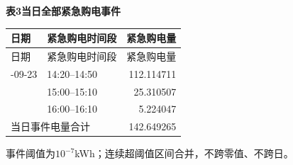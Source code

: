 \begin{center}\textbf{表3\quad 当日全部紧急购电事件}\end{center}
\begin{longtable}{llr}\toprule 日期 & 紧急购电时间段 & 紧急购电量\\\midrule\endfirsthead
\toprule 日期 & 紧急购电时间段 & 紧急购电量\\\midrule\endhead
\bottomrule\endfoot
2025-09-23 & 14:20--14:50 & 112.114711\\
 & 15:00--15:10 & 25.310507\\
 & 16:00--16:10 & 5.224047\\
\midrule\multicolumn{2}{l}{当日事件电量合计} & 142.649265\\
\end{longtable}
\noindent 事件阈值为$10^{-7}$kWh；连续超阈值区间合并，不跨零值、不跨日。
\endgroup
\clearpage

